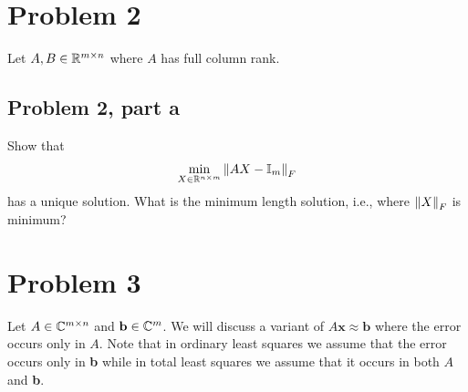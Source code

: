 \newpage
\section{Problem 2}
Let $A, B \in \mathbb{R}^{m \times n}$ where $A$ has full column rank.

\subsection{Problem 2, part a}
Show that 
\[
\min_{X \in \mathbb{R}^{n\times m}} \norm{AX - \mathbb{I}_m}_F
\]
has a unique solution. What is the minimum length solution, i.e., where $\norm{X}_F$ is minimum?

\newpage
\section{Problem 3}
Let $A \in \mathbb{C}^{m\times n}$ and $\textbf{b} \in \mathbb{C}^m$. We will discuss a variant of $A\textbf{x} \approx \textbf{b}$ where the error occurs only in $A$. Note that in ordinary least squares we assume that the error occurs only in \textbf{b} while in total least squares we assume that it occurs in both $A$ and \textbf{b}.

